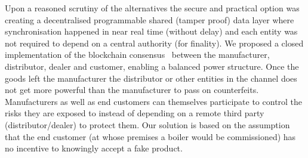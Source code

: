 \documentclass{article}
\begin{document}
Upon a reasoned scrutiny of the alternatives the secure and practical option was creating a decentralised programmable shared (tamper proof) data layer where synchronisation happened in near real time (without delay) and each entity was not required to depend on a central authority (for finality). We proposed a closed implementation of the blockchain consensus~\cite{satoshi,wef2,wef3} between the manufacturer, distributor, dealer and customer, enabling a balanced power structure. Once the goods left the manufacturer the distributor or other entities in the channel does not get more powerful than the manufacturer to pass on counterfeits. Manufacturers as well as end customers can themselves participate to control the risks they are exposed to instead of depending on a remote third party (distributor/dealer) to protect them.   %
Our solution is based on the assumption that the end customer (at whose premises a boiler would be commissioned) has no incentive to knowingly accept a fake product.%
\end{document}
